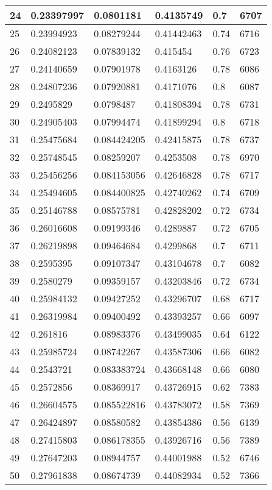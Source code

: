 \begin{longtable}{|l|l|l|l|l|l|}
24 & 0.23397997 & 0.0801181 & 0.4135749 & 0.7 & 6707 \\ \hline 
25 & 0.23994923 & 0.08279244 & 0.41442463 & 0.74 & 6716 \\ \hline 
26 & 0.24082123 & 0.07839132 & 0.415454 & 0.76 & 6723 \\ \hline 
27 & 0.24140659 & 0.07901978 & 0.4163126 & 0.78 & 6086 \\ \hline 
28 & 0.24807236 & 0.07920881 & 0.4171076 & 0.8 & 6087 \\ \hline 
29 & 0.2495829 & 0.0798487 & 0.41808394 & 0.78 & 6731 \\ \hline 
30 & 0.24905403 & 0.07994474 & 0.41899294 & 0.8 & 6718 \\ \hline 
31 & 0.25475684 & 0.084424205 & 0.42415875 & 0.78 & 6737 \\ \hline 
32 & 0.25748545 & 0.08259207 & 0.4253508 & 0.78 & 6970 \\ \hline 
33 & 0.25456256 & 0.084153056 & 0.42646828 & 0.78 & 6717 \\ \hline 
34 & 0.25494605 & 0.084400825 & 0.42740262 & 0.74 & 6709 \\ \hline 
35 & 0.25146788 & 0.08575781 & 0.42828202 & 0.72 & 6734 \\ \hline 
36 & 0.26016608 & 0.09199346 & 0.4289887 & 0.72 & 6705 \\ \hline 
37 & 0.26219898 & 0.09464684 & 0.4299868 & 0.7 & 6711 \\ \hline 
38 & 0.2595395 & 0.09107347 & 0.43104678 & 0.7 & 6082 \\ \hline 
39 & 0.2580279 & 0.09359157 & 0.43203846 & 0.72 & 6734 \\ \hline 
40 & 0.25984132 & 0.09427252 & 0.43296707 & 0.68 & 6717 \\ \hline 
41 & 0.26319984 & 0.09400492 & 0.43393257 & 0.66 & 6097 \\ \hline 
42 & 0.261816 & 0.08983376 & 0.43499035 & 0.64 & 6122 \\ \hline 
43 & 0.25985724 & 0.08742267 & 0.43587306 & 0.66 & 6082 \\ \hline 
44 & 0.2543721 & 0.083383724 & 0.43668148 & 0.66 & 6080 \\ \hline 
45 & 0.2572856 & 0.08369917 & 0.43726915 & 0.62 & 7383 \\ \hline 
46 & 0.26604575 & 0.085522816 & 0.43783072 & 0.58 & 7369 \\ \hline 
47 & 0.26424897 & 0.08580582 & 0.43854386 & 0.56 & 6139 \\ \hline 
48 & 0.27415803 & 0.086178355 & 0.43926716 & 0.56 & 7389 \\ \hline 
49 & 0.27647203 & 0.08944757 & 0.44001988 & 0.52 & 6746 \\ \hline 
50 & 0.27961838 & 0.08674739 & 0.44082934 & 0.52 & 7366 \\ \hline 
\end{longtable}